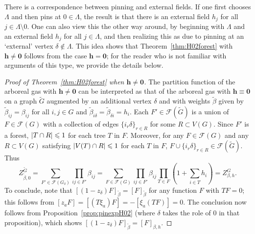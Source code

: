 \documentclass[11pt]{amsart}
\numberwithin{equation}{section}
\numberwithin{theorem}{section}
\newcommand{\cc}[1]{\mathcal{#1}}
\newcommand{\V}[1]{\boldsymbol{#1}}
\begin{document}
There is a correspondence between pinning and external fields. If one
first chooses $\Lambda$ and then pins at $0\in\Lambda$, the result is
that there is an external field $h_j$ for all
$j\in\Lambda\setminus 0$. One can also view this the other way around,
by beginning with $\Lambda$ and an external field $h_j$ for all
$j\in\Lambda$, and then realizing this as due to pinning at an
`external' vertex $\delta\notin\Lambda$. This idea shows that
Theorem~\ref{thm:H02forest} with $\V{h}\neq \V{0}$ follows from the case
$\V{h}=\V{0}$; for the reader who is not familiar with arguments of this
type, we provide the details below.

\begin{proof}[Proof of Theorem~\ref{thm:H02forest} when $\V{h}\neq \V{0}$]
  The partition function of the arboreal gas with $\V{h} \neq \V{0}$ can be
  interpreted as that of the arboreal gas with $\V{h} \equiv \V{0}$ on a graph
  $\tilde G$ augmented by an additional vertex $\delta$ and with
  weights $\tilde \beta$ given by $\tilde \beta_{ij} = \beta_{ij}$ for
  all $i,j\in G$ and
  $\tilde \beta_{i\delta} = \tilde \beta_{\delta i} = h_i$.  Each
  $F'\in \cc F(\tilde G)$ is a union of $F\in \cc F(G)$ with a
  collection of edges $\{i_{r}\delta\}_{r\in R}$ for some
  $R\subset V(G)$. Since $F'$ is a forest, $\lvert T\cap R \rvert\leqslant 1$ for
  each tree $T$ in $F$.  Moreover, for any $F\in \cc F(G)$ and any
  $R\subset V(G)$ satisfying $\lvert V(T)\cap R \rvert\leqslant 1$ for each $T$ in
  $F$, $F\cup \{i_{r}\delta\}_{r\in R}\in \cc F(\tilde G)$.  Thus
  \begin{equation}
    Z_{\tilde\beta,0}^{\tilde G}
    = \sum_{F'\in \cc F(G_{\delta})} \prod_{ij \in F'} \beta_{ij}
    = \sum_{F\in \cc F(G)}\prod_{ij \in F'} \beta_{ij} \prod_{T\in
      F}(1+\sum_{i\in T}h_{i})
    = Z_{\beta,h}^G.
  \end{equation}
%
  To conclude, note that
  $[(1-z_\delta)F]_{\tilde \beta} = [F]_{\tilde \beta}$
  for any function $F$ with $TF=0$; 
  this follows from $[z_aF] = [(T\xi_a)F] = -[\xi_a(TF)] = 0$. The
  conclusion now follows from Proposition~\ref{prop:pinexpH02}
  (where $\delta$ takes the role of $0$ in that proposition), which
  shows $[(1-z_\delta)F]_{\tilde\beta} = [F]_{\beta,h}$.
\end{proof}
\end{document}

